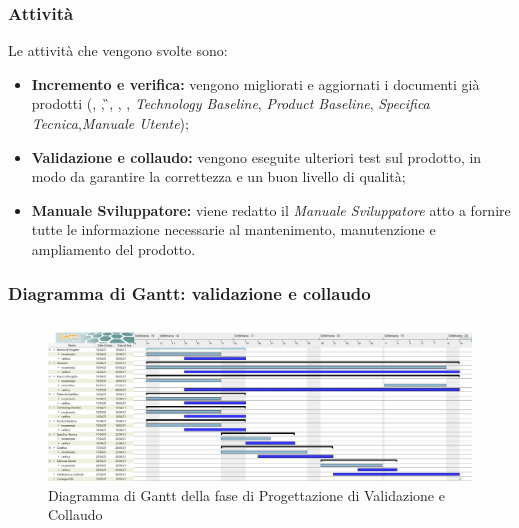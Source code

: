 \subsubsection{Attività}
Le attività che vengono svolte sono:
\begin{itemize}
	\item \textbf{Incremento e verifica:} vengono migliorati e aggiornati i documenti già prodotti (\NdP{}, \PdP{}, \G{}, \PdQ{}, \AdR{}, \textit{Technology Baseline}, \textit{Product Baseline}, \textit{Specifica Tecnica},\textit{Manuale Utente});
	\item \textbf{Validazione e collaudo:} vengono eseguite ulteriori test sul prodotto, in modo da garantire la correttezza e un buon livello di qualità;
	\item \textbf{Manuale Sviluppatore:} viene redatto il \textit{Manuale Sviluppatore} atto a fornire tutte le informazione necessarie al mantenimento, manutenzione e ampliamento del prodotto.
\end{itemize}
\subsubsection{Diagramma di Gantt: validazione e collaudo}
\begin{figure}[H]
    \centering
    \includegraphics[scale = 0.25]{components/img/validazione_collaudo.jpg}
    \caption{Diagramma di Gantt della fase di Progettazione di Validazione e Collaudo}
    \label{fig:Diagramma di Gantt, fase di Validazione e collaudo}
\end{figure}

